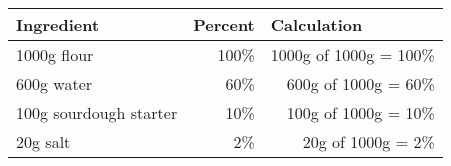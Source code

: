 


\begin{tabular}{lrr}
\toprule
\textbf{Ingredient}    & \multicolumn{1}{l}{\textbf{Percent}} & \multicolumn{1}{l}{\textbf{Calculation}}  \\ \midrule
1000g flour            & 100\%                                & 1000g of 1000g = 100\%                    \\ \midrule
600g water             & 60\%                                 & 600g of 1000g = 60\%                      \\ \midrule
100g sourdough starter & 10\%                                 & 100g of 1000g = 10\%                      \\ \midrule
20g salt               & 2\%                                  & 20g of 1000g = 2\%                        \\ \bottomrule
\end{tabular}

